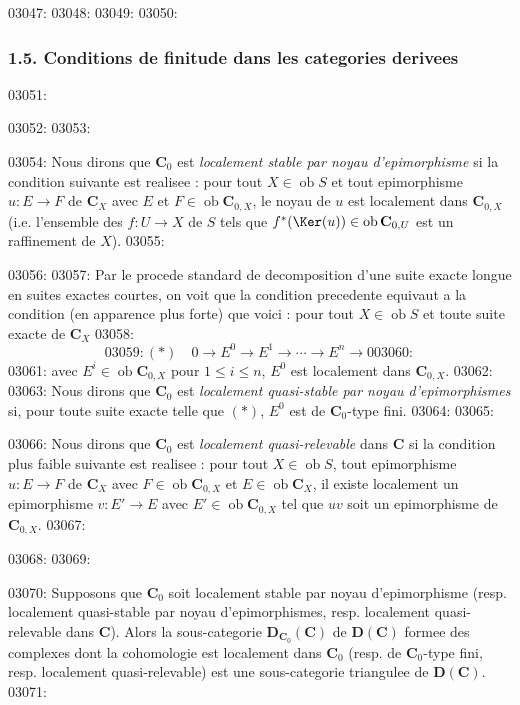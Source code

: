 03047: 
03048: %
03049: 
03050: \subsubsection*{1.5. Conditions de finitude dans les categories derivees}
03051: 
03052: 
03053: \begin{definition}
03054: Nous dirons que $\mathbf{C}_0$ est \emph{localement stable par noyau d'epimorphisme} si la condition suivante est realisee : pour tout $X \in \operatorname{ob} S$ et tout epimorphisme $u : E \to F$ de $\mathbf{C}_X$ avec $E$ et $F \in \operatorname{ob} \mathbf{C}_{0,X}$, le noyau de $u$ est localement dans $\mathbf{C}_{0,X}$ (i.e. l'ensemble des $f : U \to X$ de $S$ tels que $f^*(\Ker(u)) \in \operatorname{ob} \mathbf{C}_{0,U}$ est un raffinement de $X$).
03055: \end{definition}
03056: 
03057: Par le procede standard de decomposition d'une suite exacte longue en suites exactes courtes, on voit que la condition precedente equivaut a la condition (en apparence plus forte) que voici : pour tout $X \in \operatorname{ob} S$ et toute suite exacte de $\mathbf{C}_X$
03058: \[
03059: (*) \quad 0 \longrightarrow E^0 \longrightarrow E^1 \longrightarrow \cdots \longrightarrow E^n \longrightarrow 0
03060: \]
03061: avec $E^i \in \operatorname{ob} \mathbf{C}_{0,X}$ pour $1 \leq i \leq n$, $E^0$ est localement dans $\mathbf{C}_{0,X}$.
03062: 
03063: Nous dirons que $\mathbf{C}_0$ est \emph{localement quasi-stable par noyau d'epimorphismes} si, pour toute suite exacte telle que $(*)$, $E^0$ est de $\mathbf{C}_0$-type fini.
03064: 
03065: \begin{definition}
03066: Nous dirons que $\mathbf{C}_0$ est \emph{localement quasi-relevable} dans $\mathbf{C}$ si la condition plus faible suivante est realisee : pour tout $X \in \operatorname{ob} S$, tout epimorphisme $u : E \to F$ de $\mathbf{C}_X$ avec $F \in \operatorname{ob} \mathbf{C}_{0,X}$ et $E \in \operatorname{ob} \mathbf{C}_X$, il existe localement un epimorphisme $v : E' \to E$ avec $E' \in \operatorname{ob} \mathbf{C}_{0,X}$ tel que $uv$ soit un epimorphisme de $\mathbf{C}_{0,X}$.
03067: \end{definition}
03068: 
03069: \begin{theoreme}[1.5.1]
03070: Supposons que $\mathbf{C}_0$ soit localement stable par noyau d'epimorphisme (resp. localement quasi-stable par noyau d'epimorphismes, resp. localement quasi-relevable dans $\mathbf{C}$). Alors la sous-categorie $\mathbf{D}_{\mathbf{C}_0}(\mathbf{C})$ de $\mathbf{D}(\mathbf{C})$ formee des complexes dont la cohomologie est localement dans $\mathbf{C}_0$ (resp. de $\mathbf{C}_0$-type fini, resp. localement quasi-relevable) est une sous-categorie triangulee de $\mathbf{D}(\mathbf{C})$.
03071: \end{theoreme}
